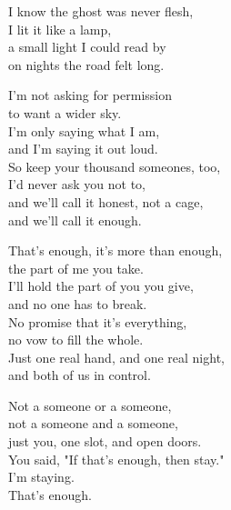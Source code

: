 \begin{lyrics}
I know the ghost was never flesh,\\
I lit it like a lamp,\\
a small light I could read by\\
on nights the road felt long.

I'm not asking for permission\\
to want a wider sky.\\
I'm only saying what I am,\\
and I'm saying it out loud.\\
So keep your thousand someones, too,\\
I'd never ask you not to,\\
and we'll call it honest, not a cage,\\
and we'll call it enough.

That's enough, it's more than enough,\\
the part of me you take.\\
I'll hold the part of you you give,\\
and no one has to break.\\
No promise that it's everything,\\
no vow to fill the whole.\\
Just one real hand, and one real night,\\
and both of us in control.

Not a someone or a someone,\\
not a someone and a someone,\\
just you, one slot, and open doors.\\
You said, "If that's enough, then stay."\\
I'm staying.\\
That's enough.
\end{lyrics}

